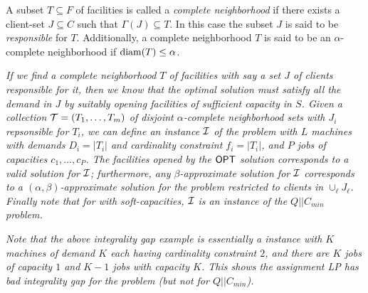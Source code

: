 \begin{definition} \label{def:comp-nbr}
	A subset $T\subseteq F$ of facilities is called a {\em complete neighborhood} if there exists a client-set $J\subseteq C$ such that $\Gamma(J) \subseteq T$.
	In this case the subset $J$ is said to be {\em responsible} for $T$. Additionally, a complete neighborhood $T$ is said to be an $\alpha$-complete neighborhood if $\mathrm{diam}(T) \leq \alpha$.
\end{definition}
\begin{remark}\label{rem:red}
	\emph{
If we find a complete neighborhood $T$ of facilities with say a set $J$ of clients responsible for it, then we know that the optimal solution must satisfy all the demand in $J$ by suitably opening facilities of sufficient capacity in $S$. Given a collection ${\cal T} = (T_1,\ldots,T_m)$ of disjoint $\alpha$-complete neighborhood sets with $J_i$ repsonsible for $T_i$, we can define an instance ${\cal I}$ of the \cckp problem with $L$ machines with demands $D_i = |T_i|$ and cardinality constraint $f_i = |T_i|$, and $P$ jobs of capacities $c_1,\ldots,c_P$. The facilities opened by the $\mathsf{OPT} $ solution corresponds to a valid solution for ${\cal I}$; furthermore, any $\beta$-approximate solution for ${\cal I}$ corresponds to a $(\alpha,\beta)$-approximate solution for the \mckc problem restricted to clients in $\cup_{\ell} J_\ell$. Finally note that for \mckc with soft-capacities, ${\cal I}$ is an instance of the $Q||C_{min}$ problem.
}

\emph{
Note that the above integrality gap  example is essentially a \cckp instance with $K$ machines of demand $K$ each having cardinality constraint $2$, and there are $K$ jobs of capacity $1$ and $K-1$ jobs with capacity $K$. This shows the assignment LP has bad integrality gap for the \cckp problem (but not for $Q||C_{min}$).}
\end{remark}

